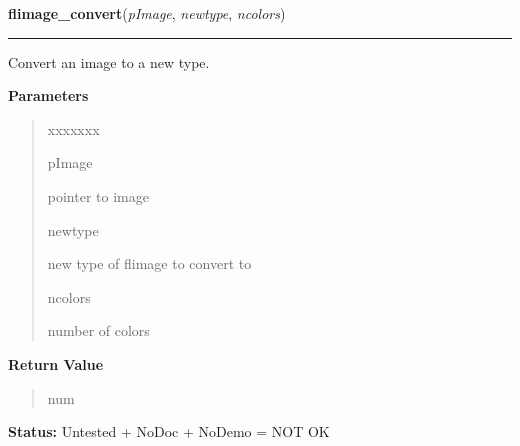 \hspace{.8\funcindent}\begin{boxedminipage}{\funcwidth}

    \raggedright \textbf{flimage\_convert}(\textit{pImage}, \textit{newtype}, \textit{ncolors})

    \vspace{-1.5ex}

    \rule{\textwidth}{0.5\fboxrule}
\setlength{\parskip}{2ex}
    Convert an image to a new type.

\setlength{\parskip}{1ex}
      \textbf{Parameters}
      \vspace{-1ex}

      \begin{quote}
        \begin{Ventry}{xxxxxxx}

          \item[pImage]

          pointer to image

          \item[newtype]

          new type of flimage to convert to

          \item[ncolors]

          number of colors

        \end{Ventry}

      \end{quote}

      \textbf{Return Value}
    \vspace{-1ex}

      \begin{quote}
      num

      \end{quote}

\textbf{Status:} Untested + NoDoc + NoDemo = NOT OK



    \end{boxedminipage}

    \label{xformslib:library:flimage_type_name}

    \vspace{0.5ex}

